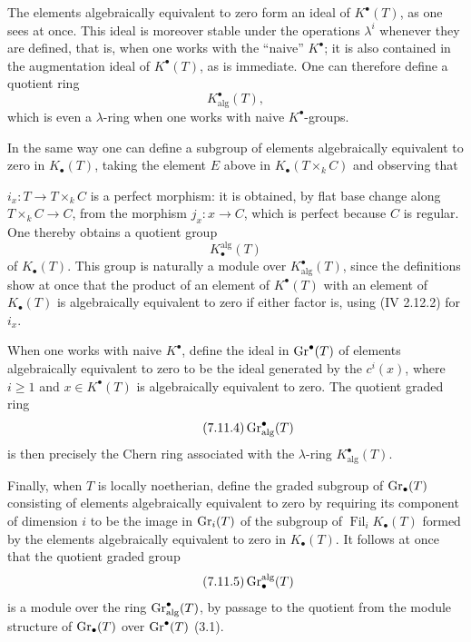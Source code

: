 The elements algebraically equivalent to zero form an ideal of
$K^\bullet(T)$, as one sees at once. This ideal is moreover stable under the
operations $\lambda^i$ whenever they are defined, that is, when one works
with the ``naive'' $K^\bullet$; it is also contained in the augmentation
ideal of $K^\bullet(T)$, as is immediate. One can therefore define a quotient
ring
\begin{equation}\tag{7.11.2}
K^\bullet_{\mathrm{alg}}(T),
\end{equation}
which is even a $\lambda$-ring when one works with naive $K^\bullet$-groups.

In the same way one can define a subgroup of elements algebraically
equivalent to zero in $K_\bullet(T)$, taking the element $E$ above in
$K_\bullet(T\times_k C)$ and observing that

$i_x:T\to T\times_k C$ is a perfect morphism: it is obtained, by flat base
change along $T\times_k C\to C$, from the morphism $j_x:x\to C$, which is
perfect because $C$ is regular. One thereby obtains a quotient group
\begin{equation}\tag{7.11.3}
K_\bullet^{\mathrm{alg}}(T)
\end{equation}
of $K_\bullet(T)$. This group is naturally a module over
$K^\bullet_{\mathrm{alg}}(T)$, since the definitions show at once that the
product of an element of $K^\bullet(T)$ with an element of $K_\bullet(T)$ is
algebraically equivalent to zero if either factor is, using (IV 2.12.2) for
$i_x$.

When one works with naive $K^\bullet$, define the ideal in $\operatorname{Gr}^\bullet(T)$
of elements algebraically equivalent to zero to be the ideal generated by the
$c^i(x)$, where $i\geq1$ and $x\in K^\bullet(T)$ is algebraically equivalent
to zero. The quotient graded ring
\begin{equation}\tag{7.11.4}
\operatorname{Gr}^\bullet_{\mathrm{alg}}(T)
\end{equation}
is then precisely the Chern ring associated with the $\lambda$-ring
$K^\bullet_{\mathrm{alg}}(T)$.

Finally, when $T$ is locally noetherian, define the graded subgroup of
$\operatorname{Gr}_\bullet(T)$ consisting of elements algebraically equivalent to zero by
requiring its component of dimension $i$ to be the image in $\operatorname{Gr}_i(T)$ of
the subgroup of $\operatorname{Fil}_iK_\bullet(T)$ formed by the elements algebraically
equivalent to zero in $K_\bullet(T)$. It follows at once that the quotient
graded group
\begin{equation}\tag{7.11.5}
\operatorname{Gr}_\bullet^{\mathrm{alg}}(T)
\end{equation}
is a module over the ring $\operatorname{Gr}^\bullet_{\mathrm{alg}}(T)$, by passage to the
quotient from the module structure of $\operatorname{Gr}_\bullet(T)$ over
$\operatorname{Gr}^\bullet(T)$ (3.1).

